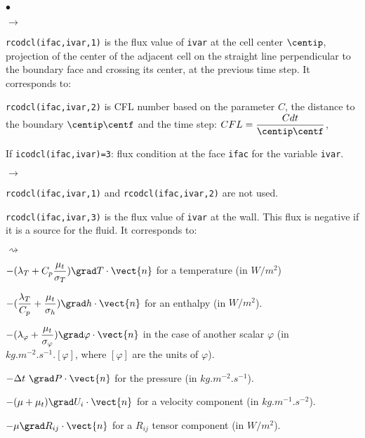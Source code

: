 {{{\begin{list}{$\bullet$}{}
\begin{list}{$\rightarrow$}{}
\item \texttt{rcodcl(ifac,ivar,1)} is the flux value of \texttt{ivar} at the cell center $\centip$,
      projection of the center of the adjacent cell on the straight line
      perpendicular to the boundary face and crossing its center,
      at the previous time step.
      It corresponds to:
\item \texttt{rcodcl(ifac,ivar,2)} is CFL number based on the parameter $C$,
      the distance to the boundary $\centip \centf$ and the time step:
      $CFL = \dfrac{C dt }{\centip \centf}$,

\end{list}

\item If \texttt{icodcl(ifac,ivar)=3}: flux condition at the face \texttt{ifac}
      for the variable \texttt{ivar}.

\begin{list}{$\rightarrow$}{}
\item \texttt{rcodcl(ifac,ivar,1)} and \texttt{rcodcl(ifac,ivar,2)} are not used.

\item \texttt{rcodcl(ifac,ivar,3)} is the flux value of \texttt{ivar} at the
      wall. This flux is negative if it is a source for the fluid. It corresponds to:
\begin{list}{$\rightsquigarrow$}{}
\item
$\displaystyle -(\lambda_T+C_p\frac{\mu_t}{\sigma_T})\grad T\cdot\vect{n}$ for a temperature (in $W/m^2$)

$\displaystyle -(\frac{\lambda_T}{C_p}+\frac{\mu_t}{\sigma_h})\grad h\cdot\vect{n}$
     for an enthalpy (in $W/m^2$).

$\displaystyle -(\lambda_\varphi+\frac{\mu_t}{\sigma_\varphi})\grad\varphi\cdot\vect{n}$ in the case of another scalar $\varphi$ (in $kg.m^{-2}.s^{-1}.[\varphi]$, where $[\varphi]$ are the units of $\varphi$).

\item $-\Delta t\ \grad P\cdot\vect{n}$ for the pressure (in $kg.m^{-2}.s^{-1}$).

\item $-(\mu+\mu_t)\grad U_i\cdot\vect{n}$ for a velocity component (in $kg.m^{-1}.s^{-2}$).

\item $-\mu\grad R_{ij}\cdot\vect{n}$ for a $R_{ij}$ tensor component (in $W/m^2$).
\end{list}

\end{list}


\end{list}}}}
